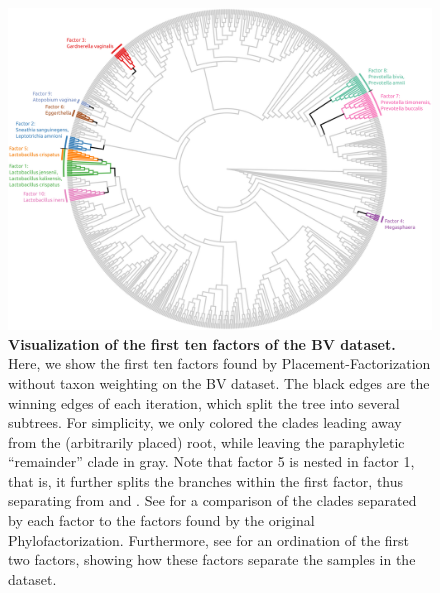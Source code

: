 \begin{figure}[!tbp]
    \centering
     \includegraphics[width=\linewidth]{pdf/factors_tree.pdf}
    \caption[Visualization of the first ten factors of the \acs{BV} dataset]{
        \textbf{Visualization of the first ten factors of the \ac{BV} dataset.}
        Here, we show the first ten factors found by Placement-Factorization without taxon weighting on the \ac{BV} dataset.
        The black edges are the winning edges of each iteration, which split the tree into several subtrees.
        For simplicity, we only colored the clades leading away from the (arbitrarily placed) root,
        while leaving the paraphyletic ``remainder'' clade in gray.
        Note that factor 5 is nested in factor 1, that is, it further splits the branches within the first factor,
        thus separating 
        from  and .
        See  for a comparison of the clades separated by each factor
        to the factors found by the original Phylofactorization.
        Furthermore, see  for an ordination
        of the first two factors, showing how these factors separate the samples in the dataset.
    }
    \label{fig:factors_tree}
\end{figure}

